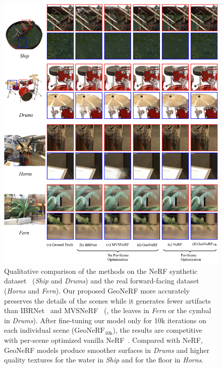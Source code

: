 \begin{figure}[!t]
    \begin{center}
        \includegraphics[width=1.0\linewidth]{images/chapter3/figures/Qualitative.jpg}
    \end{center}
    \vspace{-4.5ex}
    \caption{Qualitative comparison of the methods on the NeRF synthetic dataset~\citep{martin2021nerf} (\textit{Ship} and \textit{Drums}) and the real forward-facing dataset~\citep{mildenhall2019llff} (\textit{Horns} and \textit{Fern}). Our proposed GeoNeRF more accurately preserves the details of the scenes while it generates fewer artifacts than IBRNet~\citep{wang2021ibrnet} and MVSNeRF~\citep{chen2021mvsnerf} (\eg, the leaves in \textit{Fern} or the cymbal in \textit{Drums}). After fine-tuning our model only for 10k iterations on each individual scene ($\text{GeoNeRF}_{\text{10k}}$), the results are competitive with per-scene optimized vanilla NeRF~\citep{mildenhall2020nerf}. Compared with NeRF, GeoNeRF models produce smoother surfaces in \textit{Drums} and higher quality textures for the water in \textit{Ship} and for the floor in \textit{Horns}.}
    \label{fig:c3_qualitative}
\end{figure}

